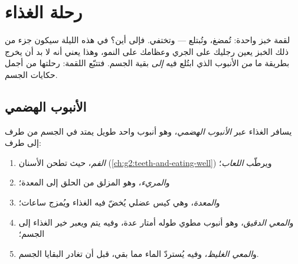 \chapter{رحلة الغذاء}\label{ch:g4:journey-of-food}

لقمة خبز واحدة: تُمضغ، وتُبتلع --- وتختفي. فإلى أين؟ في هذه الليلة
سيكون جزء من ذلك الخبز يعين رجليك على الجري وعظامك على النمو، وهذا
يعني أنه لا بد أن يخرج بطريقة ما \emph{من} الأنبوب الذي ابتُلع
فيه \emph{إلى} بقية الجسم. فتتبّع اللقمة: رحلتها من أجمل حكايات
الجسم.

\section{الأنبوب الهضمي}

\begin{definition}\label{def:g4:journey-of-food:tract}
يسافر الغذاء عبر \emph{الأنبوب الهضمي}، وهو
أنبوب واحد طويل يمتد في الجسم من طرف إلى طرف:
\begin{enumerate}
  \item \emph{الفم}، حيث تطحن الأسنان
        (\cref{ch:g2:teeth-and-eating-well}) ويرطّب
        \emph{اللعاب}؛
  \item و\emph{المريء}، وهو المزلق من الحلق إلى
        المعدة؛
  \item و\emph{المعدة}، وهي كيس عضلي يُخضّ فيه الغذاء
        ويُمزج  ساعات؛
  \item و\emph{المعي الدقيق}، وهو أنبوب مطوي طوله
        أمتار عدة، وفيه يتم  ويعبر خير الغذاء إلى الجسم؛
  \item و\emph{المعي الغليظ}، وفيه يُستردّ الماء
        مما بقي، قبل أن تغادر البقايا الجسم.
\end{enumerate}
\end{definition}

